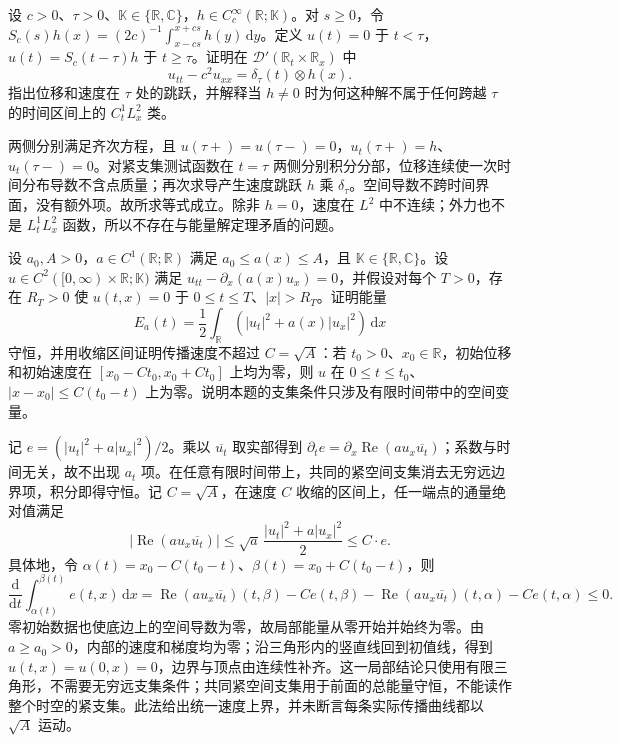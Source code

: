 \begin{exercise}\label{b2:ex:09-impulse}
设 \(c>0\)、\(\tau>0\)、\(\mathbb K\in\{\mathbb R,\mathbb C\}\)，\(h\in C_c^\infty(\mathbb R;\mathbb K)\)。对 \(s\geq0\)，令 \(S_c(s)h(x)=(2c)^{-1}\int_{x-cs}^{x+cs}h(y)\,\mathrm{d}y\)。定义 \(u(t)=0\) 于 \(t<\tau\)，\(u(t)=S_c(t-\tau)h\) 于 \(t\geq\tau\)。证明在 \(\mathcal D'(\mathbb R_t\times\mathbb R_x)\) 中
\[
 u_{tt}-c^2u_{xx}=\delta_\tau(t)\otimes h(x).
\]
指出位移和速度在 \(\tau\) 处的跳跃，并解释当 \(h\ne0\) 时为何这种解不属于任何跨越 \(\tau\) 的时间区间上的 \(C^1_tL^2_x\) 类。
\end{exercise}
\begin{solution}
两侧分别满足齐次方程，且 \(u(\tau+)=u(\tau-)=0\)，\(u_t(\tau+)=h\)、\(u_t(\tau-)=0\)。对紧支集测试函数在 \(t=\tau\) 两侧分别积分分部，位移连续使一次时间分布导数不含点质量；再次求导产生速度跳跃 \(h\) 乘 \(\delta_\tau\)。空间导数不跨时间界面，没有额外项。故所求等式成立。除非 \(h=0\)，速度在 \(L^2\) 中不连续；外力也不是 \(L^1_tL^2_x\) 函数，所以不存在与能量解定理矛盾的问题。
\end{solution}

\begin{exercise}\label{b2:ex:09-variable-speed}
设 \(a_0,A>0\)，\(a\in C^1(\mathbb R;\mathbb R)\) 满足 \(a_0\leq a(x)\leq A\)，且 \(\mathbb K\in\{\mathbb R,\mathbb C\}\)。设 \(u\in C^2([0,\infty)\times\mathbb R;\mathbb K)\) 满足 \(u_{tt}-\partial_x(a(x)u_x)=0\)，并假设对每个 \(T>0\)，存在 \(R_T>0\) 使 \(u(t,x)=0\) 于 \(0\leq t\leq T\)、\(|x|>R_T\)。证明能量
\[
 E_a(t)=\frac12\int_{\mathbb R}(|u_t|^2+a(x)|u_x|^2)\,\mathrm{d}x
\]
守恒，并用收缩区间证明传播速度不超过 \(C=\sqrt A\)：若 \(t_0>0\)、\(x_0\in\mathbb R\)，初始位移和初始速度在 \([x_0-Ct_0,x_0+Ct_0]\) 上均为零，则 \(u\) 在 \(0\leq t\leq t_0\)、\(|x-x_0|\leq C(t_0-t)\) 上为零。说明本题的支集条件只涉及有限时间带中的空间变量。
\end{exercise}
\begin{solution}
记 \(e=(|u_t|^2+a|u_x|^2)/2\)。乘以 \(\overline{u_t}\) 取实部得到 \(\partial_te=\partial_x\operatorname{Re}(a u_x\overline{u_t})\)；系数与时间无关，故不出现 \(a_t\) 项。在任意有限时间带上，共同的紧空间支集消去无穷远边界项，积分即得守恒。记 \(C=\sqrt A\)，在速度 \(C\) 收缩的区间上，任一端点的通量绝对值满足
\[
 |\operatorname{Re}(a u_x\overline{u_t})|
 \leq\sqrt a\,\dfrac{|u_t|^2+a|u_x|^2}{2}\leq C\cdot e.
\]
具体地，令 \(\alpha(t)=x_0-C(t_0-t)\)、\(\beta(t)=x_0+C(t_0-t)\)，则
\[
 \frac{\mathrm{d}}{\mathrm{d}t}\int_{\alpha(t)}^{\beta(t)}e(t,x)\,\mathrm{d}x
 =\operatorname{Re}(a u_x\overline{u_t})(t,\beta)-C e(t,\beta)
 -\operatorname{Re}(a u_x\overline{u_t})(t,\alpha)-C e(t,\alpha)\leq0.
\]
零初始数据也使底边上的空间导数为零，故局部能量从零开始并始终为零。由 \(a\geq a_0>0\)，内部的速度和梯度均为零；沿三角形内的竖直线回到初值线，得到 \(u(t,x)=u(0,x)=0\)，边界与顶点由连续性补齐。这一局部结论只使用有限三角形，不需要无穷远支集条件；共同紧空间支集用于前面的总能量守恒，不能读作整个时空的紧支集。此法给出统一速度上界，并未断言每条实际传播曲线都以 \(\sqrt A\) 运动。
\end{solution}

